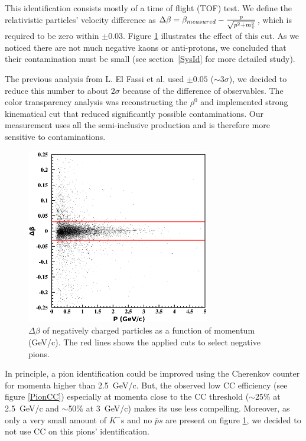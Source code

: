 This identification consists mostly of a time of flight (TOF) test. We define 
the relativistic particles' velocity difference as
$\Delta \beta = \beta_{measured} - {p \over \sqrt{p^2 + m_\pi^2}}$, which is required to be zero within $\pm 0.03$. Figure \ref{PionTOF} illustrates the effect of this cut. As we noticed there are not much negative kaons or anti-protons, we concluded that their contamination must be small (see section~\ref{SysId} for more detailed study).

The previous analysis from L. El Fassi et al. used $\pm 0.05$ ($\sim 3\sigma$), we decided
to reduce this number to about $2\sigma$ because of the difference of observables. The 
color transparency analysis was reconstructing the $\rho^0$ and implemented strong kinematical
cut that reduced significantly possible contaminations. Our measurement uses all the 
semi-inclusive production and is therefore more sensitive to contaminations. 

\begin{figure}[tbp]
\centering
\includegraphics[width=8cm] {chap5-fig/fig05.png} 
\caption {$\Delta \beta$ of negatively charged particles as a function of momentum (GeV/c). The red lines shows the applied cuts to select negative pions.}
\label{PionTOF}
\end{figure}

In principle, a pion identification could be improved using the Cherenkov counter 
for momenta higher than 2.5~GeV/c. But, the observed low CC efficiency (see figure 
\ref{PionCC}) especially at momenta close to the CC threshold ($\sim$25\% at 
2.5~GeV/c and $\sim$50\% at 3~GeV/c) makes its use less compelling. 
Moreover, as only a very small amount of $K^-$s and no ${\bar p}s$ are present on figure \ref{PionTOF}, we decided to not use CC on this pions' identification.

